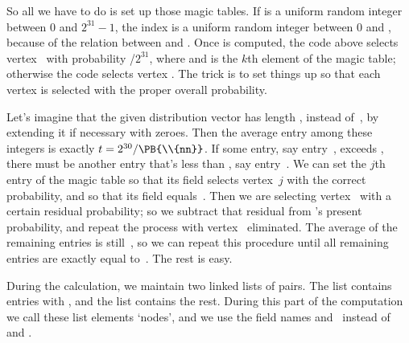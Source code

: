 So all we have to do is set up those magic tables. If  is a
uniform
random integer between 0 and $2^{31}-1$, the index 
is a
uniform random integer between 0
and , because of the relation between  and . Once  is
computed, the code above selects vertex~ with probability
/$2^{31}$, where  and  is the $k$th
element of the magic table; otherwise the code selects
vertex . The trick is to set things up so that each
vertex
is selected with the proper overall probability.

Let's imagine that the given distribution vector has length ,
instead of~, by extending it if necessary with zeroes. Then the
average entry among these  integers is exactly $t=2^{30}/\PB{%
\\{nn}}$.
If some entry, say entry~, exceeds , there must be another
entry
that's less than , say entry~. We can set the $j$th entry
of the magic table so that its  field selects vertex~$j$ with the
correct probability, and so that its  field equals~. Then
we are selecting vertex~ with a certain residual probability; so we
subtract that residual from 's present probability, and repeat the
process with vertex~ eliminated. The average of the remaining entries
is still~, so we can repeat this procedure until all remaining entries
are exactly equal to~. The rest is easy.

During the calculation, we maintain two linked lists of
 pairs. The  list contains entries with %
,
and the  list contains the rest. During this part of the computation
we call these list elements `nodes', and we use the field names
 and~ instead of  and .

